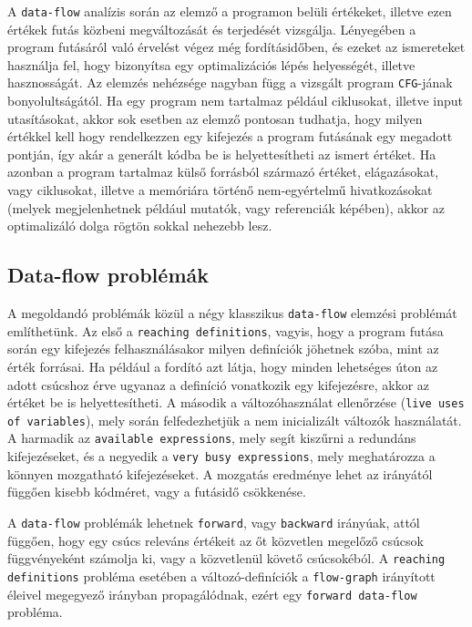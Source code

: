 \documentclass[12pt,a4paper]{article}
\begin{document}
A \texttt{data-flow} analízis során az elemző a programon belüli értékeket, illetve ezen értékek futás közbeni megváltozását és terjedését vizsgálja. Lényegében a program futásáról való érvelést végez még fordításidőben, és ezeket az ismereteket használja fel, hogy bizonyítsa egy optimalizációs lépés helyességét, illetve hasznosságát. Az elemzés nehézsége nagyban függ a vizsgált program \texttt{CFG}-jának bonyolultságától. Ha egy program nem tartalmaz például ciklusokat, illetve input utasításokat, akkor sok esetben az elemző pontosan tudhatja, hogy milyen értékkel kell hogy rendelkezzen egy kifejezés a program futásának egy megadott pontján, így akár a generált kódba be is helyettesítheti az ismert értéket. Ha azonban a program tartalmaz külső forrásból származó értéket, elágazásokat, vagy ciklusokat, illetve a memóriára történő nem-egyértelmű hivatkozásokat (melyek megjelenhetnek például mutatók, vagy referenciák képében), akkor az optimalizáló dolga rögtön sokkal nehezebb lesz.

\subsection{Data-flow problémák}

A megoldandó problémák közül a négy klasszikus \texttt{data-flow} elemzési problémát említhetünk. Az első a \texttt{reaching definitions}, vagyis, hogy a program futása során egy kifejezés felhasználásakor milyen definíciók jöhetnek szóba, mint az érték forrásai. Ha például a fordító azt látja, hogy minden lehetséges úton az adott csúcshoz érve ugyanaz a definíció vonatkozik egy kifejezésre, akkor az értéket be is helyettesítheti. A második a változóhasználat ellenőrzése (\texttt{live uses of variables}), mely során felfedezhetjük a  nem inicializált változók használatát. A harmadik az \texttt{available expressions}, mely segít kiszűrni a redundáns kifejezéseket, és a negyedik a \texttt{very busy expressions}, mely meghatározza a könnyen mozgatható kifejezéseket. A mozgatás eredménye lehet az irányától függően kisebb kódméret, vagy a futásidő csökkenése.

A \texttt{data-flow} problémák lehetnek \texttt{forward}, vagy \texttt{backward} irányúak, attól függően, hogy egy csúcs releváns értékeit az őt közvetlen megelőző csúcsok függvényeként számolja ki, vagy a közvetlenül követő csúcsokéból. A \texttt{reaching definitions}  probléma esetében a változó-definíciók a \texttt{flow-graph} irányított éleivel megegyező irányban propagálódnak, ezért egy \texttt{forward data-flow} probléma.
\end{document}
